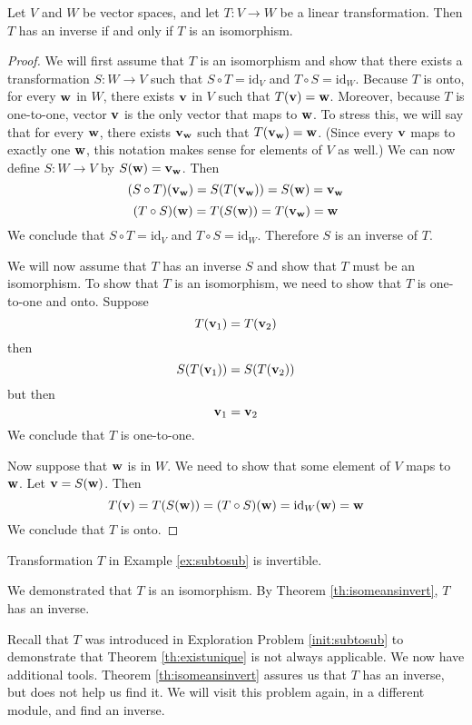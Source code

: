 \documentclass{ximera}
\renewcommand{\vec}[1]{{\bf #1}}
\newcommand{\id}{\text{id}}
\begin{document}
\begin{theorem}\label{th:isomeansinvert} Let $V$ and $W$ be vector spaces, and let $T:V\rightarrow W$ be a linear transformation.  Then $T$ has an inverse if and only if $T$ is an isomorphism. 
\end{theorem}
\begin{proof}
We will first assume that $T$ is an isomorphism and show that there exists a transformation $S:W\rightarrow V$ such that $S\circ T=\id_V$ and $T\circ S=\id_W$.  Because $T$ is onto, for every $\vec{w}$ in $W$, there exists $\vec{v}$ in $V$ such that $T(\vec{v})=\vec{w}$.  Moreover, because $T$ is one-to-one, vector $\vec{v}$ is the only vector that maps to $\vec{w}$.  To stress this, we will say that for every $\vec{w}$, there exists $\vec{v}_{\vec{w}}$ such that $T(\vec{v}_{\vec{w}})=\vec{w}$. (Since every $\vec{v}$ maps to exactly one $\vec{w}$, this notation makes sense for elements of $V$ as well.)  We can now define $S:W\rightarrow V$ by $S(\vec{w})=\vec{v}_{\vec{w}}$.
Then
$$(S\circ T)(\vec{v}_{\vec{w}})=S(T(\vec{v}_{\vec{w}}))=S(\vec{w})=\vec{v}_{\vec{w}}$$
$$(T\circ S)(\vec{w})=T(S(\vec{w}))=T(\vec{v}_{\vec{w}})=\vec{w}$$
We conclude that $S\circ T=\id_V$ and $T\circ S=\id_W$.  Therefore $S$ is an inverse of $T$.

We will now assume that $T$ has an inverse $S$ and show that $T$ must be an isomorphism.  To show that $T$ is an isomorphism, we need to show that $T$ is one-to-one and onto.
Suppose $$T(\vec{v}_1)=T(\vec{v}_2)$$ then $$S(T(\vec{v}_1))=S(T(\vec{v}_2))$$
but then
$$\vec{v}_1=\vec{v}_2$$
We conclude that $T$ is one-to-one.

Now suppose that $\vec{w}$ is in $W$.  We need to show that some element of $V$ maps to $\vec{w}$.  Let $\vec{v}=S(\vec{w})$.  Then
$$T(\vec{v})=T(S(\vec{w}))=(T\circ S)(\vec{w})=\id_W(\vec{w})=\vec{w}$$
We conclude that $T$ is onto.
\end{proof}

\begin{example}
Transformation $T$ in Example \ref{ex:subtosub} is invertible.
\begin{explanation}
We demonstrated that $T$ is an isomorphism.  By Theorem \ref{th:isomeansinvert}, $T$ has an inverse.  

Recall that $T$ was introduced in Exploration Problem \ref {init:subtosub} to demonstrate that Theorem \ref{th:existunique} is not always applicable.  We now have additional tools. Theorem \ref{th:isomeansinvert} assures us that $T$ has an inverse, but does not help us find it. We will visit this problem again, in a different module, and find an inverse.
\end{explanation}
\end{example}
\end{document}
